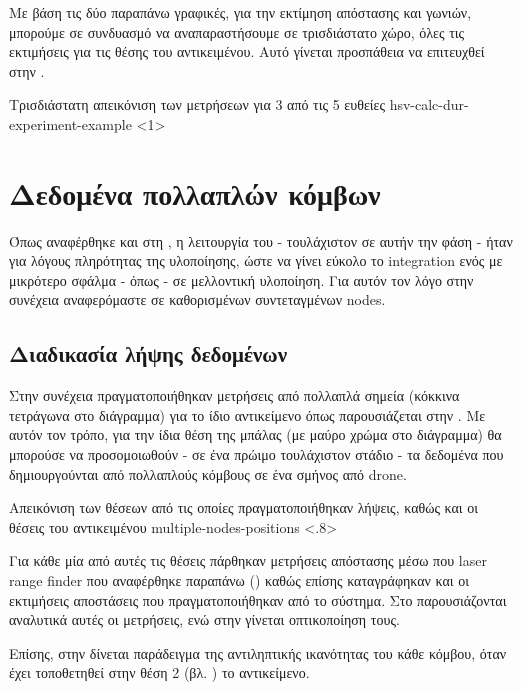 Με βάση τις δύο παραπάνω γραφικές, για την εκτίμηση απόστασης και γωνιών, μπορούμε σε συνδυασμό να αναπαραστήσουμε σε τρισδιάστατο χώρο, όλες τις εκτιμήσεις για τις θέσης του αντικειμένου. Αυτό γίνεται προσπάθεια να επιτευχθεί στην .

{Τρισδιάστατη απεικόνιση των μετρήσεων για 3 από τις 5 ευθείες}%
{hsv-calc-dur-experiment-example}%
<1>

\section{Δεδομένα πολλαπλών κόμβων}
Όπως αναφέρθηκε και στη , η λειτουργία του  - τουλάχιστον σε αυτήν την φάση - ήταν για λόγους πληρότητας της υλοποίησης, ώστε να γίνει εύκολο το integration ενός  με μικρότερο σφάλμα - όπως   - σε μελλοντική υλοποίηση. Για αυτόν τον λόγο στην συνέχεια αναφερόμαστε σε καθορισμένων συντεταγμένων nodes.

\subsection{Διαδικασία λήψης δεδομένων} \label{sec:multiple-nodes-data-collection}
Στην συνέχεια πραγματοποιήθηκαν μετρήσεις από πολλαπλά σημεία (κόκκινα τετράγωνα στο διάγραμμα) για το ίδιο αντικείμενο όπως παρουσιάζεται στην .
Με αυτόν τον τρόπο, για την ίδια θέση της μπάλας (με μαύρο χρώμα στο διάγραμμα) θα μπορούσε να προσομοιωθούν - σε ένα πρώιμο τουλάχιστον στάδιο - τα δεδομένα που δημιουργούνται από πολλαπλούς κόμβους σε ένα σμήνος από drone. 

{Απεικόνιση των θέσεων από τις οποίες πραγματοποιήθηκαν λήψεις, καθώς και οι θέσεις του αντικειμένου}%
{multiple-nodes-positions}%
<.8>

Για κάθε μία από αυτές τις θέσεις πάρθηκαν μετρήσεις απόστασης μέσω που laser range finder που αναφέρθηκε παραπάνω () καθώς επίσης καταγράφηκαν και οι εκτιμήσεις αποστάσεις που πραγματοποιήθηκαν από το σύστημα. Στο  παρουσιάζονται αναλυτικά αυτές οι μετρήσεις, ενώ στην  γίνεται οπτικοποίηση τους.

Επίσης, στην  δίνεται παράδειγμα της αντιληπτικής ικανότητας του κάθε κόμβου, όταν έχει τοποθετηθεί στην θέση 2 (βλ. ) το αντικείμενο.


